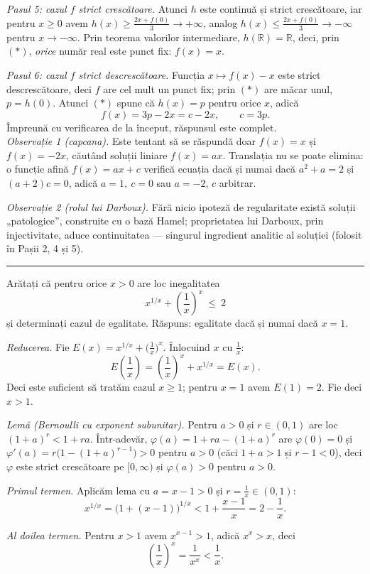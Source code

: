 \emph{Pasul 5: cazul $f$ strict crescătoare.} Atunci $h$ este continuă și strict crescătoare, iar pentru $x\ge0$ avem $h(x)\ge\frac{2x+f(0)}{3}\to+\infty$, analog $h(x)\le\frac{2x+f(0)}{3}\to-\infty$ pentru $x\to-\infty$. Prin teorema valorilor intermediare, $h(\mathbb{R})=\mathbb{R}$, deci, prin $(\ast)$, \emph{orice} număr real este punct fix: $f(x)=x$.

\emph{Pasul 6: cazul $f$ strict descrescătoare.} Funcția $x\mapsto f(x)-x$ este strict descrescătoare, deci $f$ are cel mult un punct fix; prin $(\ast)$ are măcar unul, $p=h(0)$. Atunci $(\ast)$ spune că $h(x)=p$ pentru orice $x$, adică
\[ f(x)=3p-2x=c-2x,\qquad c=3p . \]
Împreună cu verificarea de la început, răspunsul este complet.\\[2pt]
\emph{Observație 1 (capcana).} Este tentant să se răspundă doar $f(x)=x$ și $f(x)=-2x$, căutând soluții liniare $f(x)=ax$. Translația nu se poate elimina: o funcție afină $f(x)=ax+c$ verifică ecuația dacă și numai dacă $a^2+a=2$ și $(a+2)c=0$, adică $a=1,\ c=0$ sau $a=-2$, $c$ arbitrar.

\emph{Observație 2 (rolul lui Darboux).} Fără nicio ipoteză de regularitate există soluții „patologice'', construite cu o bază Hamel; proprietatea lui Darboux, prin injectivitate, aduce continuitatea --- singurul ingredient analitic al soluției (folosit în Pașii 2, 4 și 5).
\vspace{1mm}\hrule

Arătați că pentru orice $x>0$ are loc inegalitatea
\[ x^{1/x}+\left(\frac1x\right)^{x}\ \le\ 2 \]
și determinați cazul de egalitate.
\sol Răspuns: egalitate dacă și numai dacă $x=1$.

\emph{Reducerea.} Fie $E(x)=x^{1/x}+\bigl(\frac1x\bigr)^x$. Înlocuind $x$ cu $\frac1x$:
\[ E\!\left(\frac1x\right)=\left(\frac1x\right)^{x}+x^{1/x}=E(x) . \]
Deci este suficient să tratăm cazul $x\ge1$; pentru $x=1$ avem $E(1)=2$. Fie deci $x>1$.

\emph{Lemă (Bernoulli cu exponent subunitar).} Pentru $a>0$ și $r\in(0,1)$ are loc $(1+a)^r<1+ra$. Într-adevăr, $\varphi(a)=1+ra-(1+a)^r$ are $\varphi(0)=0$ și $\varphi'(a)=r\bigl(1-(1+a)^{r-1}\bigr)>0$ pentru $a>0$ (căci $1+a>1$ și $r-1<0$), deci $\varphi$ este strict crescătoare pe $[0,\infty)$ și $\varphi(a)>0$ pentru $a>0$.

\emph{Primul termen.} Aplicăm lema cu $a=x-1>0$ și $r=\frac1x\in(0,1)$:
\[ x^{1/x}=\bigl(1+(x-1)\bigr)^{1/x}<1+\frac{x-1}{x}=2-\frac1x . \]

\emph{Al doilea termen.} Pentru $x>1$ avem $x^{x-1}>1$, adică $x^x>x$, deci
\[ \left(\frac1x\right)^{x}=\frac{1}{x^x}<\frac1x . \]

